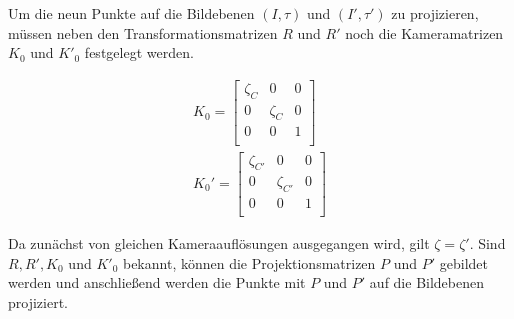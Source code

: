 %


Um die neun Punkte auf die Bildebenen $(I,\tau)$ und $(I',\tau')$ zu projizieren, müssen neben den Transformationsmatrizen $R$ und $R'$ noch die Kameramatrizen $K_0$ und $K'_0$ festgelegt werden.


\begin{gather}		
K_0 =
\begin{bmatrix}
\zeta_{C}&0&0\\
0&\zeta_{C}&0\\
0&0&1\\
\end{bmatrix}\label{eq:eq4.9}\\
K_0' =
\begin{bmatrix}
\zeta_{C'}&0&0\\
0&\zeta_{C'}&0\\
0&0&1\\
\end{bmatrix}\label{eq:eq4.10}
\end{gather}

Da zunächst von gleichen Kameraauflösungen ausgegangen wird, gilt $\zeta = \zeta'$. Sind $R,R',K_0$ und $K'_0$ bekannt, können die Projektionsmatrizen $P$ und $P'$ gebildet werden und anschließend werden die Punkte mit $P$ und $P'$ auf die Bildebenen projiziert.


